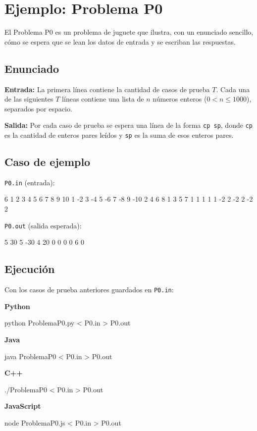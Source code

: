 \section{Ejemplo: Problema P0}
El Problema P0 es un problema de juguete que ilustra, con un enunciado sencillo, cómo se espera que se lean los datos de entrada y se escriban las respuestas.

\subsection{Enunciado}
\textbf{Entrada:} La primera línea contiene la cantidad de casos de prueba $T$. Cada una de las siguientes $T$ líneas contiene una lista de $n$ números enteros ($0 < n \leq 1000$), separados por espacio.

\textbf{Salida:} Por cada caso de prueba se espera una línea de la forma \texttt{cp sp}, donde \texttt{cp} es la cantidad de enteros pares leídos y \texttt{sp} es la suma de esos enteros pares.

\subsection{Caso de ejemplo}
\texttt{P0.in} (entrada):
\begin{pseudocode}
6
1 2 3 4 5 6 7 8 9 10
1 -2 3 -4 5 -6 7 -8 9 -10
2 4 6 8
1 3 5 7
1 1 1 1 1
-2 2 -2 2 -2 2
\end{pseudocode}

\texttt{P0.out} (salida esperada):
\begin{pseudocode}
5 30
5 -30
4 20
0 0
0 0
6 0
\end{pseudocode}

\subsection{Ejecución}
Con los casos de prueba anteriores guardados en \texttt{P0.in}:

\textbf{Python}
\begin{pseudocode}
python ProblemaP0.py < P0.in > P0.out
\end{pseudocode}

\textbf{Java}
\begin{pseudocode}
java ProblemaP0 < P0.in > P0.out
\end{pseudocode}

\textbf{C++}
\begin{pseudocode}
./ProblemaP0 < P0.in > P0.out
\end{pseudocode}

\textbf{JavaScript}
\begin{pseudocode}
node ProblemaP0.js < P0.in > P0.out
\end{pseudocode}

